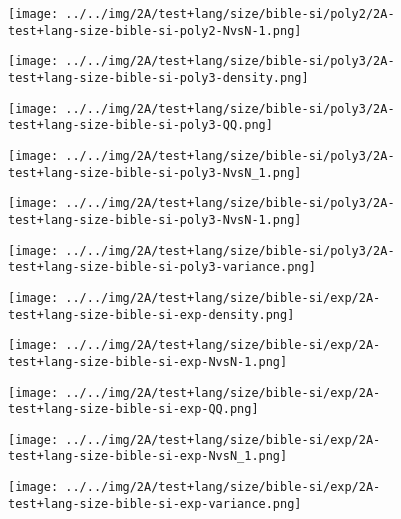 \begin{figure}[H]
\centering	\texttt{[image: ../../img/2A/test+lang/size/bible-si/poly2/2A-test+lang-size-bible-si-poly2-NvsN-1.png]}
\end{figure}
\begin{figure}[H]
\centering	\texttt{[image: ../../img/2A/test+lang/size/bible-si/poly3/2A-test+lang-size-bible-si-poly3-density.png]}
\end{figure}
\begin{figure}[H]
\centering	\texttt{[image: ../../img/2A/test+lang/size/bible-si/poly3/2A-test+lang-size-bible-si-poly3-QQ.png]}
\end{figure}
\begin{figure}[H]
\centering	\texttt{[image: ../../img/2A/test+lang/size/bible-si/poly3/2A-test+lang-size-bible-si-poly3-NvsN\_1.png]}
\end{figure}
\begin{figure}[H]
\centering	\texttt{[image: ../../img/2A/test+lang/size/bible-si/poly3/2A-test+lang-size-bible-si-poly3-NvsN-1.png]}
\end{figure}
\begin{figure}[H]
\centering	\texttt{[image: ../../img/2A/test+lang/size/bible-si/poly3/2A-test+lang-size-bible-si-poly3-variance.png]}
\end{figure}
\begin{figure}[H]
\centering	\texttt{[image: ../../img/2A/test+lang/size/bible-si/exp/2A-test+lang-size-bible-si-exp-density.png]}
\end{figure}
\begin{figure}[H]
\centering	\texttt{[image: ../../img/2A/test+lang/size/bible-si/exp/2A-test+lang-size-bible-si-exp-NvsN-1.png]}
\end{figure}
\begin{figure}[H]
\centering	\texttt{[image: ../../img/2A/test+lang/size/bible-si/exp/2A-test+lang-size-bible-si-exp-QQ.png]}
\end{figure}
\begin{figure}[H]
\centering	\texttt{[image: ../../img/2A/test+lang/size/bible-si/exp/2A-test+lang-size-bible-si-exp-NvsN\_1.png]}
\end{figure}
\begin{figure}[H]
\centering	\texttt{[image: ../../img/2A/test+lang/size/bible-si/exp/2A-test+lang-size-bible-si-exp-variance.png]}
\end{figure}
